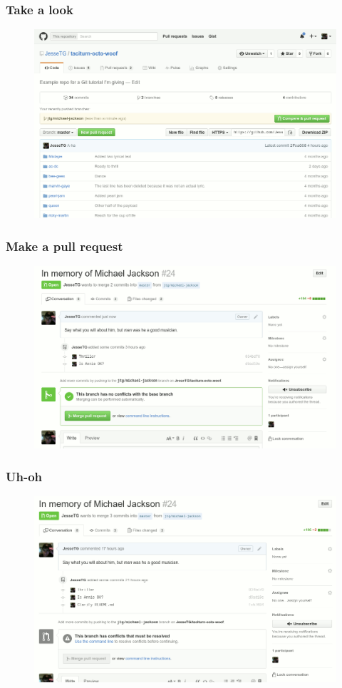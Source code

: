 \documentclass[glossy]{beamer}
\begin{document}
\begin{frame}[fragile=singleslide]
  \frametitle{Take a look}

  \begin{figure}
    \centering
    \includegraphics[width=0.9\columnwidth]{pull-request}
  \end{figure}
\end{frame}

\begin{frame}[fragile=singleslide]
  \frametitle{Make a pull request}

  \begin{figure}
    \centering
    \includegraphics[width=0.9\columnwidth]{pr-pending}
  \end{figure}
\end{frame}

\begin{frame}[fragile=singleslide]
  \frametitle{Uh-oh}

  \begin{figure}
    \centering
    \includegraphics[width=0.9\columnwidth]{merge-conflict}
  \end{figure}
\end{frame}
\end{document}

